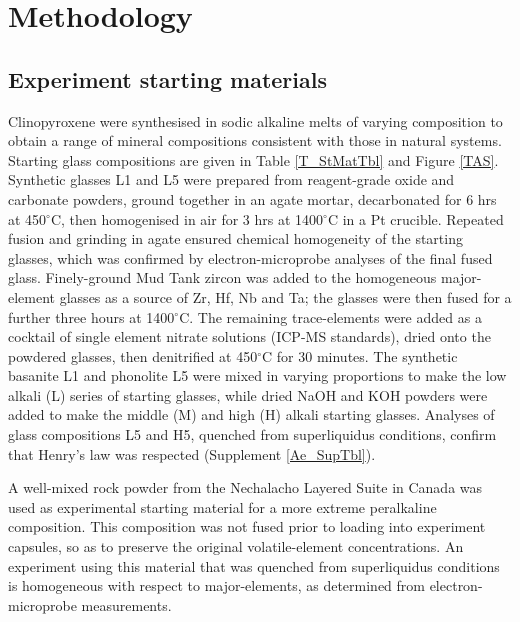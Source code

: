 \documentclass[final,authoryear,3p,times,twocolumn]{elsarticle}
\newcommand{\dgC}{$^\circ$C }
\newcommand{\dgCs}{$^\circ$C}
\begin{document}

\section{Methodology}

\subsection{Experiment starting materials}
Clinopyroxene were synthesised in sodic alkaline melts of varying composition to obtain a range of mineral compositions consistent with those in natural systems. Starting glass compositions are given in Table \ref{T_StMatTbl} and Figure \ref{TAS}. Synthetic glasses L1 and L5 were prepared from reagent-grade oxide and carbonate powders, ground together in an agate mortar, decarbonated for 6 hrs at 450\dgCs, then homogenised in air for 3 hrs at 1400\dgC in a Pt crucible. Repeated fusion and grinding in agate ensured chemical homogeneity of the starting glasses, which was confirmed by electron-microprobe analyses of the final fused glass. Finely-ground Mud Tank zircon was added to the homogeneous major-element glasses as a source of Zr, Hf, Nb and Ta; the glasses were then fused for a further three hours at 1400\dgCs. The remaining trace-elements were added as a cocktail of single element nitrate solutions (ICP-MS standards), dried onto the powdered glasses, then denitrified at 450\dgC for 30 minutes. The synthetic basanite L1 and phonolite L5 were mixed in varying proportions to make the low alkali (L) series of starting glasses, while dried NaOH and KOH powders were added to make the middle (M) and high (H) alkali starting glasses. Analyses of glass compositions L5 and H5, quenched from superliquidus conditions, confirm that Henry's law was respected (Supplement \ref{Ae_SupTbl}).

A well-mixed rock powder from the Nechalacho Layered Suite in Canada \citep[][Unit NLS-9, sample L09-194-405.5, alternative sample name \emph{VM 11-6}]{Moller2016} was used as experimental starting material for a more extreme peralkaline composition. This composition was not fused prior to loading into experiment capsules, so as to preserve the original volatile-element concentrations. An experiment using this material that was quenched from superliquidus conditions is homogeneous with respect to major-elements, as determined from electron-microprobe measurements.
\end{document}
